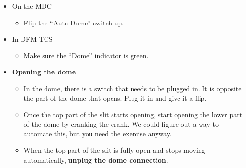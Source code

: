 \documentclass[letterpaper, 12pt]{report}
\begin{document}
\begin{itemize}
\begin{itemize}
\begin{itemize}
\begin{itemize}
						\end{itemize}
					\end{itemize}
					\begin{itemize}
						\item On the MDC
						\begin{itemize}
							\item Flip the ``Auto Dome'' switch up.
						\end{itemize}
					\end{itemize}
					\begin{itemize}
						\item In DFM TCS
						\begin{itemize}
							\item Make sure the ``Dome'' indicator is green.
						\end{itemize}
					\end{itemize}
				\end{itemize}
	\end{itemize}
\begin{itemize}
	\item \large \textbf{Opening the dome}
	\begin{itemize}
		\item In the dome, there is a switch that needs to be plugged in. It is opposite the part of the dome that opens. Plug it in and give it a flip.
		\item Once the top part of the slit starts opening, start opening the lower part of the dome by cranking the crank. We could figure out a way to automate this, but you need the exercise anyway.
		\item When the top part of the slit is fully open and stops moving automatically, \textbf{unplug the dome connection}.
	\end{itemize}
\end{itemize}
\end{document}

